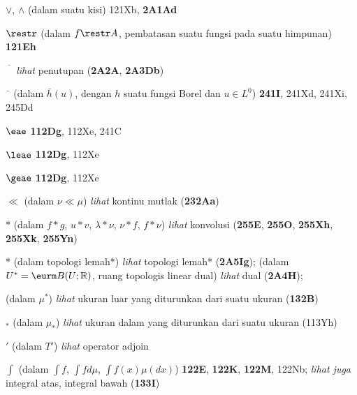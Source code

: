 $\vee$, $\wedge$ (dalam suatu kisi) 121Xb, {\bf 2A1Ad}






$\restr$ (dalam $f\restr A$, pembatasan suatu fungsi pada suatu himpunan) {\bf
121Eh}

$\overline{\phantom{A}}$ {\it lihat} penutupan ({\bf 2A2A}, {\bf
2A3Db})


$\bar{\phantom{g}}$ (dalam $\bar h(u)$, dengan $h$ suatu fungsi Borel
dan $u\in L^0$) {\bf 241I}, 241Xd, 241Xi, 245Dd


$\eae$ {\bf 112Dg}, 112Xe, 241C

$\leae$ {\bf 112Dg}, 112Xe

$\geae$ {\bf 112Dg}, 112Xe







$\ll$ (dalam $\nu\ll\mu$) {\it lihat} kontinu mutlak ({\bf 232Aa})





















$*$ (dalam $f*g$, $u*v$, $\lambda*\nu$, $\nu*f$, $f*\nu$) {\it lihat}
konvolusi ({\bf 255E}, {\bf 255O}, {\bf 255Xh},
{\bf 255Xk}, {\bf 255Yn})


* (dalam topologi lemah*) {\it lihat} topologi lemah* ({\bf 2A5Ig}); 
 (dalam $U^*=\eurm B(U;\Bbb R)$, ruang topologis linear dual)
{\it lihat} dual ({\bf 2A4H});  
 
(dalam $\mu^*$) {\it lihat} ukuran luar yang diturunkan dari suatu ukuran ({\bf 132B})

$_*$ (dalam $\mu_*$) {\it lihat} ukuran dalam yang diturunkan dari suatu ukuran
(113Yh)

$'$
(dalam $T'$) {\it lihat} operator adjoin















$\int$ (dalam $\int f$, $\int fd\mu$, $\int f(x)\mu(dx)$) {\bf 122E}, {\bf
122K}, {\bf 122M}, 122Nb;
  {\it lihat juga} integral atas, integral bawah ({\bf 133I})


